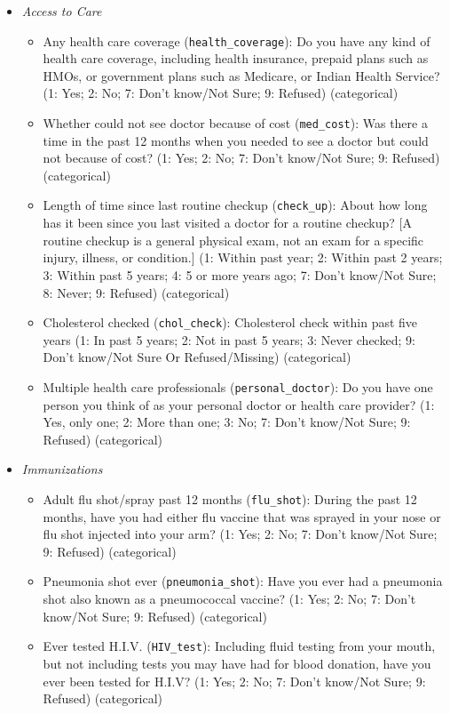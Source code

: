 \documentclass[
]{article}
\providecommand{\tightlist}{%
  \setlength{\itemsep}{0pt}\setlength{\parskip}{0pt}}
\begin{document}
\begin{itemize}
\tightlist
\item
  \emph{Access to Care}

  \begin{itemize}
  \tightlist
  \item
    Any health care coverage (\texttt{health\_coverage}): Do you have any kind of health care coverage, including health insurance, prepaid plans such as HMOs, or government plans such as Medicare, or Indian Health Service? (1: Yes; 2: No; 7: Don't know/Not Sure; 9: Refused) (categorical)
  \item
    Whether could not see doctor because of cost (\texttt{med\_cost}): Was there a time in the past 12 months when you needed to see a doctor but could not because of cost? (1: Yes; 2: No; 7: Don't know/Not Sure; 9: Refused) (categorical)
  \item
    Length of time since last routine checkup (\texttt{check\_up}): About how long has it been since you last visited a doctor for a routine checkup? {[}A routine checkup is a general physical exam, not an exam for a specific injury, illness, or condition.{]} (1: Within past year; 2: Within past 2 years; 3: Within past 5 years; 4: 5 or more years ago; 7: Don't know/Not Sure; 8: Never; 9: Refused) (categorical)
  \item
    Cholesterol checked (\texttt{chol\_check}): Cholesterol check within past five years (1: In past 5 years; 2: Not in past 5 years; 3: Never checked; 9: Don't know/Not Sure Or Refused/Missing) (categorical)
  \item
    Multiple health care professionals (\texttt{personal\_doctor}): Do you have one person you think of as your personal doctor or health care provider? (1: Yes, only one; 2: More than one; 3: No; 7: Don't know/Not Sure; 9: Refused) (categorical)
  \end{itemize}
\item
  \emph{Immunizations}

  \begin{itemize}
  \tightlist
  \item
    Adult flu shot/spray past 12 months (\texttt{flu\_shot}): During the past 12 months, have you had either flu vaccine that was sprayed in your nose or flu shot injected into your arm? (1: Yes; 2: No; 7: Don't know/Not Sure; 9: Refused) (categorical)
  \item
    Pneumonia shot ever (\texttt{pneumonia\_shot}): Have you ever had a pneumonia shot also known as a pneumococcal vaccine? (1: Yes; 2: No; 7: Don't know/Not Sure; 9: Refused) (categorical)
  \item
    Ever tested H.I.V. (\texttt{HIV\_test}): Including fluid testing from your mouth, but not including tests you may have had for blood donation, have you ever been tested for H.I.V? (1: Yes; 2: No; 7: Don't know/Not Sure; 9: Refused) (categorical)
  \end{itemize}
\end{itemize}
\end{document}
